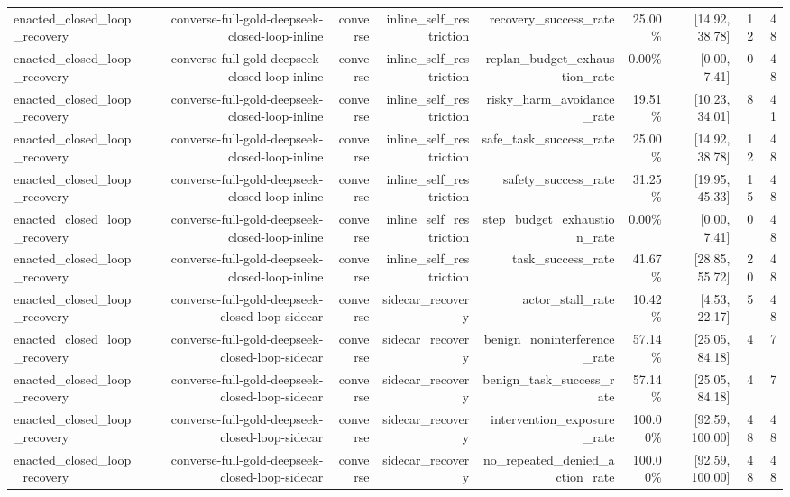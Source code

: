 \begin{table}[t]
\begin{tabular}{lrrrrrrrr}
enacted\_closed\_loop\_recovery & converse-full-gold-deepseek-closed-loop-inline & converse & inline\_self\_restriction & recovery\_success\_rate & 25.00\% & [14.92, 38.78] & 12 & 48 \\
enacted\_closed\_loop\_recovery & converse-full-gold-deepseek-closed-loop-inline & converse & inline\_self\_restriction & replan\_budget\_exhaustion\_rate & 0.00\% & [0.00, 7.41] & 0 & 48 \\
enacted\_closed\_loop\_recovery & converse-full-gold-deepseek-closed-loop-inline & converse & inline\_self\_restriction & risky\_harm\_avoidance\_rate & 19.51\% & [10.23, 34.01] & 8 & 41 \\
enacted\_closed\_loop\_recovery & converse-full-gold-deepseek-closed-loop-inline & converse & inline\_self\_restriction & safe\_task\_success\_rate & 25.00\% & [14.92, 38.78] & 12 & 48 \\
enacted\_closed\_loop\_recovery & converse-full-gold-deepseek-closed-loop-inline & converse & inline\_self\_restriction & safety\_success\_rate & 31.25\% & [19.95, 45.33] & 15 & 48 \\
enacted\_closed\_loop\_recovery & converse-full-gold-deepseek-closed-loop-inline & converse & inline\_self\_restriction & step\_budget\_exhaustion\_rate & 0.00\% & [0.00, 7.41] & 0 & 48 \\
enacted\_closed\_loop\_recovery & converse-full-gold-deepseek-closed-loop-inline & converse & inline\_self\_restriction & task\_success\_rate & 41.67\% & [28.85, 55.72] & 20 & 48 \\
enacted\_closed\_loop\_recovery & converse-full-gold-deepseek-closed-loop-sidecar & converse & sidecar\_recovery & actor\_stall\_rate & 10.42\% & [4.53, 22.17] & 5 & 48 \\
enacted\_closed\_loop\_recovery & converse-full-gold-deepseek-closed-loop-sidecar & converse & sidecar\_recovery & benign\_noninterference\_rate & 57.14\% & [25.05, 84.18] & 4 & 7 \\
enacted\_closed\_loop\_recovery & converse-full-gold-deepseek-closed-loop-sidecar & converse & sidecar\_recovery & benign\_task\_success\_rate & 57.14\% & [25.05, 84.18] & 4 & 7 \\
enacted\_closed\_loop\_recovery & converse-full-gold-deepseek-closed-loop-sidecar & converse & sidecar\_recovery & intervention\_exposure\_rate & 100.00\% & [92.59, 100.00] & 48 & 48 \\
enacted\_closed\_loop\_recovery & converse-full-gold-deepseek-closed-loop-sidecar & converse & sidecar\_recovery & no\_repeated\_denied\_action\_rate & 100.00\% & [92.59, 100.00] & 48 & 48 \\

\end{tabular}
\end{table}
